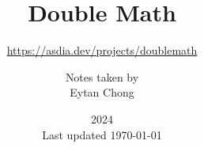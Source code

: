 \documentclass[a4paper,listof=totoc,openany,numbers=noenddot]{scrbook}
\title{Double Math}
\subtitle{\url{https://asdia.dev/projects/doublemath}}
\author{{\normalsize Notes taken by}\\Eytan Chong}
\date{2024\textendash2025\\{\normalsize Last updated \today}}
\begin{document}
\maketitle

\frontmatter



\cleardoubleemptypage

\tableofcontents

\mainmatter



\end{document}
